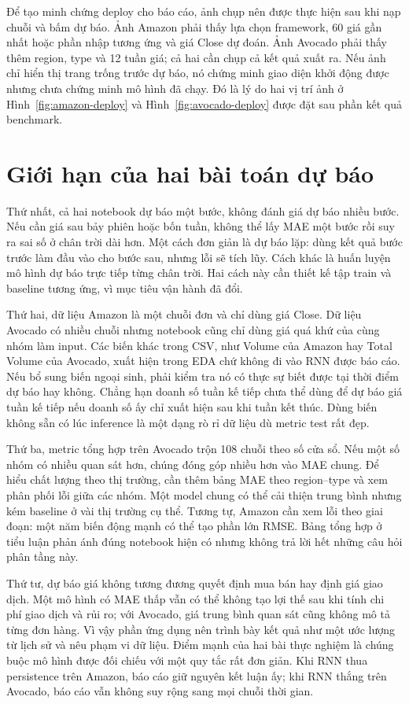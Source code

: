 \documentclass[12pt,a4paper]{report}
\begin{document}
Để tạo minh chứng deploy cho báo cáo, ảnh chụp nên được thực hiện sau khi nạp chuỗi và bấm dự báo. Ảnh Amazon phải thấy lựa chọn framework, 60 giá gần nhất hoặc phần nhập tương ứng và giá Close dự đoán. Ảnh Avocado phải thấy thêm region, type và 12 tuần giá; cả hai cần chụp cả kết quả xuất ra. Nếu ảnh chỉ hiển thị trang trống trước dự báo, nó chứng minh giao diện khởi động được nhưng chưa chứng minh mô hình đã chạy. Đó là lý do hai vị trí ảnh ở Hình~\ref{fig:amazon-deploy} và Hình~\ref{fig:avocado-deploy} được đặt sau phần kết quả benchmark.

\section{Giới hạn của hai bài toán dự báo}
Thứ nhất, cả hai notebook dự báo một bước, không đánh giá dự báo nhiều bước. Nếu cần giá sau bảy phiên hoặc bốn tuần, không thể lấy MAE một bước rồi suy ra sai số ở chân trời dài hơn. Một cách đơn giản là dự báo lặp: dùng kết quả bước trước làm đầu vào cho bước sau, nhưng lỗi sẽ tích lũy. Cách khác là huấn luyện mô hình dự báo trực tiếp từng chân trời. Hai cách này cần thiết kế tập train và baseline tương ứng, vì mục tiêu vận hành đã đổi.

Thứ hai, dữ liệu Amazon là một chuỗi đơn và chỉ dùng giá Close. Dữ liệu Avocado có nhiều chuỗi nhưng notebook cũng chỉ dùng giá quá khứ của cùng nhóm làm input. Các biến khác trong CSV, như Volume của Amazon hay Total Volume của Avocado, xuất hiện trong EDA chứ không đi vào RNN được báo cáo. Nếu bổ sung biến ngoại sinh, phải kiểm tra nó có thực sự biết được tại thời điểm dự báo hay không. Chẳng hạn doanh số tuần kế tiếp chưa thể dùng để dự báo giá tuần kế tiếp nếu doanh số ấy chỉ xuất hiện sau khi tuần kết thúc. Dùng biến không sẵn có lúc inference là một dạng rò rỉ dữ liệu dù metric test rất đẹp.

Thứ ba, metric tổng hợp trên Avocado trộn 108 chuỗi theo số cửa sổ. Nếu một số nhóm có nhiều quan sát hơn, chúng đóng góp nhiều hơn vào MAE chung. Để hiểu chất lượng theo thị trường, cần thêm bảng MAE theo region--type và xem phân phối lỗi giữa các nhóm. Một model chung có thể cải thiện trung bình nhưng kém baseline ở vài thị trường cụ thể. Tương tự, Amazon cần xem lỗi theo giai đoạn: một năm biến động mạnh có thể tạo phần lớn RMSE. Bảng tổng hợp ở tiểu luận phản ánh đúng notebook hiện có nhưng không trả lời hết những câu hỏi phân tầng này.

Thứ tư, dự báo giá không tương đương quyết định mua bán hay định giá giao dịch. Một mô hình có MAE thấp vẫn có thể không tạo lợi thế sau khi tính chi phí giao dịch và rủi ro; với Avocado, giá trung bình quan sát cũng không mô tả từng đơn hàng. Vì vậy phần ứng dụng nên trình bày kết quả như một ước lượng từ lịch sử và nêu phạm vi dữ liệu. Điểm mạnh của hai bài thực nghiệm là chúng buộc mô hình được đối chiếu với một quy tắc rất đơn giản. Khi RNN thua persistence trên Amazon, báo cáo giữ nguyên kết luận ấy; khi RNN thắng trên Avocado, báo cáo vẫn không suy rộng sang mọi chuỗi thời gian.
\end{document}

